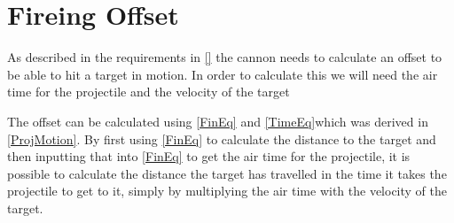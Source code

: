 \section{Fireing Offset}
As described in the requirements in \autoref{} the cannon needs to calculate an
offset to be able to hit a target in motion. In order to calculate this we will
need the air time for the projectile and the velocity of the target\nl


The offset can be calculated using \autoref{FinEq} and \autoref{TimeEq}which was
derived in \autoref{ProjMotion}. By first using \autoref{FinEq} to calculate the
distance to the target and then inputting that into \autoref{FinEq} to get the
air time for the projectile, it is possible to calculate the distance the target
has travelled in the time it takes the projectile to get to it, simply by
multiplying the air time with the velocity of the target.

